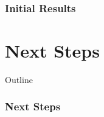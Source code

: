 \documentclass{beamer}
\begin{document}
\begin{frame}
\frametitle{Initial Results}
\end{frame}


\section{Next Steps}
\begin{frame}[noframenumbering]{Outline}
\tableofcontents[currentsection]
\end{frame}


\begin{frame}
\frametitle{Next Steps}
\end{frame}

\end{document}
